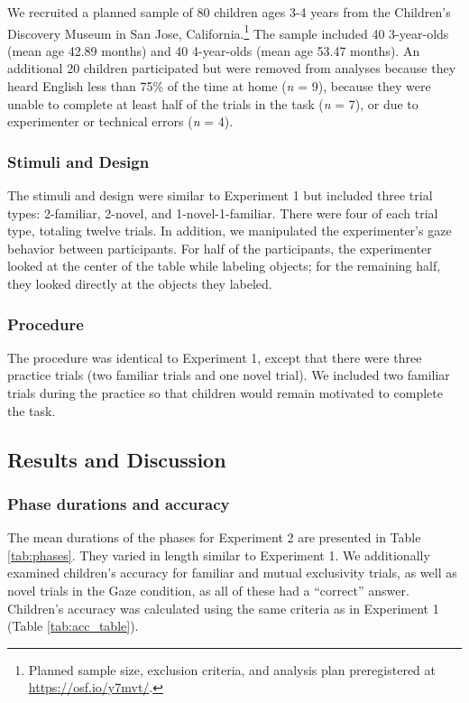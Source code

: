 \documentclass[a4paper,man,apacite,floatsintext]{apa6}
\begin{document}
We recruited a planned sample of 80 children ages 3-4 years from the
Children's Discovery Museum in San Jose, California.\footnote{Planned
  sample size, exclusion criteria, and analysis plan preregistered at
  \url{https://osf.io/y7mvt/}.} The sample included 40 3-year-olds (mean
age 42.89 months) and 40 4-year-olds (mean age 53.47 months). An
additional 20 children participated but were removed from analyses
because they heard English less than 75\% of the time at home (\emph{n}
= 9), because they were unable to complete at least half of the trials
in the task (\emph{n} = 7), or due to experimenter or technical errors
(\emph{n} = 4).

\subsubsection{Stimuli and Design}\label{stimuli-and-design-1}

The stimuli and design were similar to Experiment 1 but included three
trial types: 2-familiar, 2-novel, and 1-novel-1-familiar. There were
four of each trial type, totaling twelve trials. In addition, we
manipulated the experimenter's gaze behavior between participants. For
half of the participants, the experimenter looked at the center of the
table while labeling objects; for the remaining half, they looked
directly at the objects they labeled.

\subsubsection{Procedure}\label{procedure-1}

The procedure was identical to Experiment 1, except that there were
three practice trials (two familiar trials and one novel trial). We
included two familiar trials during the practice so that children would
remain motivated to complete the task.

\subsection{Results and Discussion}\label{results-and-discussion-1}

\subsubsection{Phase durations and
accuracy}\label{phase-durations-and-accuracy-1}

The mean durations of the phases for Experiment 2 are presented in Table
\ref{tab:phases}. They varied in length similar to Experiment 1. We
additionally examined children's accuracy for familiar and mutual
exclusivity trials, as well as novel trials in the Gaze condition, as
all of these had a ``correct'' answer. Children's accuracy was
calculated using the same criteria as in Experiment 1 (Table
\ref {tab:acc_table}).
\end{document}
